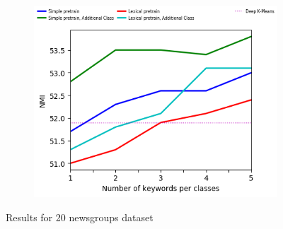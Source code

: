 \begin{figure}[!h]
\begin{subfigure}[b]{\textwidth}
    \includegraphics[scale=0.82]{parts/res/dat_file/nmi/20NEWS_NMI.png}     
  \end{subfigure}\caption{\label{fig:20news}Results for 20 newsgroups dataset}
\end{figure}

